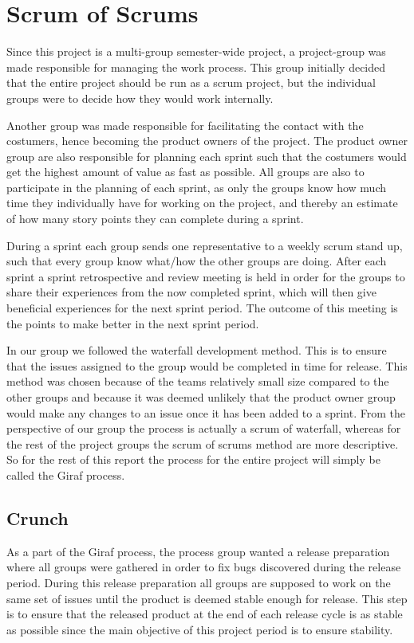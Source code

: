 \section{Scrum of Scrums}
Since this project is a multi-group semester-wide project, a project-group was made responsible for managing the work process.
This group initially decided that the entire project should be run as a scrum project, but the individual groups were to decide how they would work internally.

Another group was made responsible for facilitating the contact with the costumers, hence becoming the product owners of the project.
The product owner group are also responsible for planning each sprint such that the costumers would get the highest amount of value as fast as possible.
All groups are also to participate in the planning of each sprint, as only the groups know how much time they individually have for working on the project, and thereby an estimate of how many story points they can complete during a sprint.

During a sprint each group sends one representative to a weekly scrum stand up, such that every group know what/how the other groups are doing.
After each sprint a sprint retrospective and review meeting is held in order for the groups to share their experiences from the now completed sprint, which will then give beneficial experiences for the next sprint period.
The outcome of this meeting is the points to make better in the next sprint period.

In our group we followed the waterfall development method. 
This is to ensure that the issues assigned to the group would be completed in time for release. 
This method was chosen because of the teams relatively small size compared to the other groups and because it was deemed unlikely that the product owner group would make any changes to an issue once it has been added to a sprint.
From the perspective of our group the process is actually a scrum of waterfall, whereas for the rest of the project groups the scrum of scrums method are more descriptive.
So for the rest of this report the process for the entire project will simply be called the Giraf process.

\subsection{Crunch}
As a part of the Giraf process, the process group wanted a release preparation where all groups were gathered in order to fix bugs discovered during the release period. 
During this release preparation all groups are supposed to work on the same set of issues until the product is deemed stable enough for release. 
This step is to ensure that the released product at the end of each release cycle is as stable as possible since the main objective of this project period is to ensure stability.
